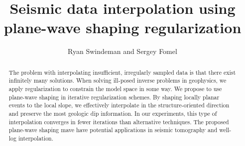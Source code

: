 
\title{Seismic data interpolation using plane-wave shaping regularization}
\author{Ryan Swindeman and Sergey Fomel}


\maketitle

\begin{abstract}
The problem with interpolating insufficient, irregularly sampled data is that there exist infinitely many solutions. When solving ill-posed inverse problems in geophysics, we apply regularization to constrain the model space in some way. We propose to use plane-wave shaping in iterative regularization schemes. By shaping locally planar events to the local slope, we effectively interpolate in the structure-oriented direction and preserve the most geologic dip information. In our experiments, this type of interpolation converges in fewer iterations than alternative techniques. The proposed plane-wave shaping mave have potential applications in seismic tomography and well-log interpolation.
\end{abstract}

